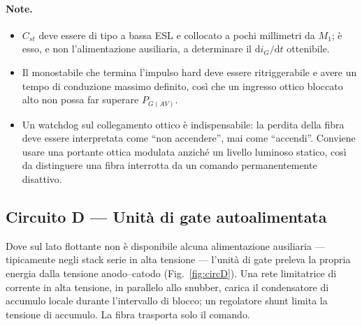\documentclass[11pt,a4paper]{article}
\begin{document}
\paragraph{Note.}
\begin{itemize}
  \item $C_{st}$ deve essere di tipo a bassa ESL e collocato a pochi millimetri da
        $M_1$; è esso, e non l'alimentazione ausiliaria, a determinare il
        $\mathrm{d}i_G/\mathrm{d}t$ ottenibile.
  \item Il monostabile che termina l'impulso hard deve essere ritriggerabile e avere
        un tempo di conduzione massimo definito, così che un ingresso ottico bloccato
        alto non possa far superare $P_{G(AV)}$.
  \item Un watchdog sul collegamento ottico è indispensabile: la perdita della fibra
        deve essere interpretata come ``non accendere'', mai come ``accendi''.
        Conviene usare una portante ottica modulata anziché un livello luminoso
        statico, così da distinguere una fibra interrotta da un comando
        permanentemente disattivo.
\end{itemize}

\subsection{Circuito D --- Unità di gate autoalimentata}

Dove sul lato flottante non è disponibile alcuna alimentazione ausiliaria ---
tipicamente negli stack serie in alta tensione --- l'unità di gate preleva la propria
energia dalla tensione anodo--catodo (Fig.~\ref{fig:circD}). Una rete limitatrice di
corrente in alta tensione, in parallelo allo snubber, carica il condensatore di
accumulo locale durante l'intervallo di blocco; un regolatore shunt limita la
tensione di accumulo. La fibra trasporta solo il comando.
\end{document}
